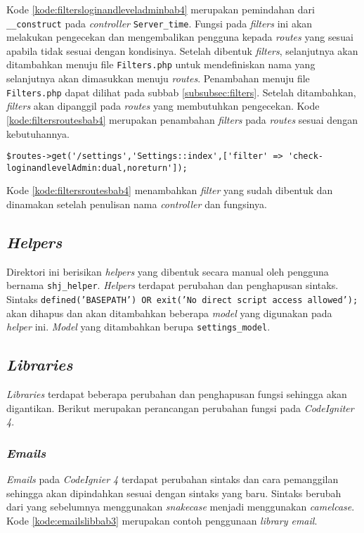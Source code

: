 Kode \ref{kode:filtersloginandleveladminbab4} merupakan pemindahan dari \texttt{\_\_construct} pada \textit{controller}  \texttt{Server\_time}. Fungsi pada \textit{filters} ini akan melakukan pengecekan dan mengembalikan pengguna kepada \textit{routes} yang sesuai apabila tidak sesuai dengan kondisinya. Setelah dibentuk \textit{filters}, selanjutnya akan ditambahkan menuju file \texttt{Filters.php} untuk mendefiniskan nama yang selanjutnya akan dimasukkan menuju \textit{routes}. Penambahan menuju file \texttt{Filters.php} dapat dilihat pada subbab \ref{subsubsec:filters}. Setelah ditambahkan, \textit{filters} akan dipanggil pada \textit{routes} yang membutuhkan pengecekan. Kode \ref{kode:filtersroutesbab4} merupakan penambahan \textit{filters} pada \textit{routes} sesuai dengan kebutuhannya.

\begin{lstlisting}[caption=Penambahan \textit{filter} pada \textit{routes}, label=kode:filtersroutesbab4]
	$routes->get('/settings','Settings::index',['filter' => 'check-loginandlevelAdmin:dual,noreturn']);
\end{lstlisting}

Kode \ref{kode:filtersroutesbab4} menambahkan \textit{filter} yang sudah dibentuk dan dinamakan setelah penulisan nama \textit{controller} dan fungsinya. 

\subsection{\textit{Helpers}}
Direktori ini berisikan \textit{helpers} yang dibentuk secara manual oleh pengguna bernama \texttt{shj\_helper}. \textit{Helpers} terdapat perubahan dan penghapusan sintaks. Sintaks \texttt{defined('BASEPATH') OR exit('No direct script access allowed');} akan dihapus dan akan ditambahkan beberapa \textit{model} yang digunakan pada \textit{helper} ini. \textit{Model} yang ditambahkan berupa \texttt{settings\_model}.

\subsection{\textit{Libraries}}
\textit{Libraries} terdapat beberapa perubahan dan penghapusan fungsi sehingga akan digantikan. Berikut merupakan perancangan perubahan fungsi pada \textit{CodeIgniter 4}.

\subsubsection{\textit{Emails}}
\textit{Emails} pada \textit{CodeIgnier 4} terdapat perubahan sintaks dan cara pemanggilan sehingga akan dipindahkan sesuai dengan sintaks yang baru. Sintaks berubah dari yang sebelumnya menggunakan \textit{snakecase} menjadi menggunakan \textit{camelcase}. Kode \ref{kode:emailslibbab3} merupakan contoh penggunaan \textit{library email}.

